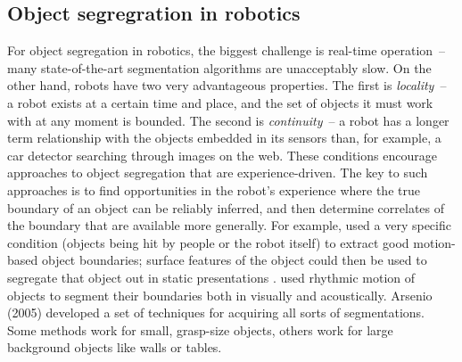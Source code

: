 \subsection{Object segregration in robotics}

For object segregation in robotics, the biggest challenge is real-time
operation~-- many state-of-the-art segmentation algorithms are
unacceptably slow.  On the other hand, robots have two very
advantageous properties.  
%
The first is
{\em locality}~-- a robot exists at a certain time and place, and the
set of objects it must work with at any moment is bounded.  
%
The second is
{\em continuity}~-- a robot has a longer term relationship with
the objects embedded in its sensors than, for example, a car 
detector searching through images on the web.
%
These conditions encourage approaches to object segregation
that are experience-driven.
%
The key to such approaches is to find
opportunities in the robot's experience where the
true boundary of an object can be reliably inferred,
and then determine correlates of the boundary that 
are available more generally.
%
For example,  used
a very specific condition (objects being hit by
people or the robot itself) to extract good
motion-based object boundaries; surface features
of the object could then be used to segregate that
object out in static presentations \cite{fitzpatrick03object}.
 used rhythmic motion
of objects to segment their boundaries both in
visually and acoustically.
%
Arsenio (2005) developed a set of techniques for acquiring all
sorts of segmentations.  Some methods work for small, grasp-size
objects, others work for large background objects like walls or
tables.





